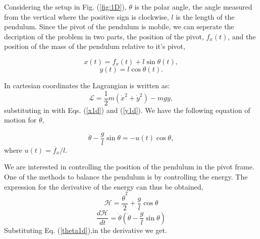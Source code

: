 \documentclass[prd,twocolumn,nofootinbib,showpacs]{revtex4-1}
\begin{document}
Considering the setup in Fig. (\ref{fig:1D}), $\theta$ is the polar angle, the angle measured from the vertical where the positive sign is clockwise, $l$ is the length of the pendulum. Since the pivot of the pendulum is mobile, we can seperate the decription of the problem in two parts, the position of the pivot, $f_x(t)$, and the position of the mass of the pendulum relative to it's pivot, 

\begin{equation}
x(t)=f_x(t)+ l \sin{\theta}(t),
\label{x1d}
\end{equation}
\begin{equation}
y(t)= l \cos{\theta}(t).
\label{y1d}
\end{equation}



\noindent In cartesian coordinates the Lagrangian is written as:
\begin{equation}
    \mathcal{L}=\frac{1}{2}m\left(\dot{x}^2+\dot{y}^2\right)-m g y,
    \label{l1d}
\end{equation}
\noindent substituting in with Eqs. (\ref{x1d}) and (\ref{y1d}). We have the following equation  of motion for $\theta$,

\begin{equation}
    \ddot{\theta}-\frac{g}{l}\sin{\theta}=-u(t)\cos{\theta},
    \label{theta1d}
\end{equation}
where $u(t)=\ddot{f_x}/l$.

\par We are interested in controlling the position of the pendulum in the pivot frame. One of the methods to balance the pendulum is by controlling the energy. The expression for the derivative of the energy can thus be obtained,
\begin{equation}
    \mathcal{H}=\frac{\dot{\theta}^2}{2}+ \frac{g}{l}\cos{\theta}
    \label{energia1d}
\end{equation}
\begin{equation}
 \frac{d\mathcal{H}}{dt}=\dot{\theta}\left(\ddot{\theta}-\frac{g}{l}\sin{\theta}\right)   
\end{equation}
Substituting Eq. (\ref{theta1d}),in the derivative we get.
\end{document}
